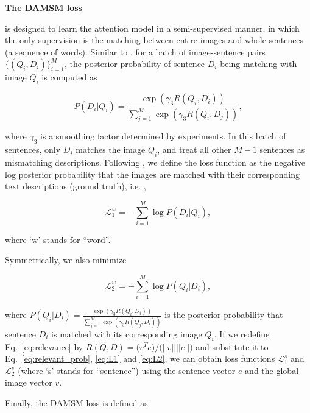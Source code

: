 \textbf{The DAMSM loss} { is designed to learn the attention model in a semi-supervised manner, in which the only supervision is the matching between entire images and whole sentences (a sequence of words). Similar to \cite{FangGISDDGHMPZZ15,Huang13LDS}, for a batch of image-sentence pairs $\{(Q_i, D_i)\}_{i=1}^M$, the posterior probability of sentence $D_i$ being matching with image $Q_i$ is computed as

\begin{equation}\label{eq:relevant_prob}
  P(D_i|Q_i) = \frac{\exp(\gamma_{3} R(Q_i, D_i))}{\sum_{j=1}^M{\exp(\gamma_{3} R(Q_i, D_{j}))}},
 \end{equation}

where $\gamma_{3}$ is a smoothing factor determined by experiments. In this batch of sentences, only $D_i$ matches the image $Q_i$, and treat all other $M-1$ sentences as mismatching descriptions. Following \cite{FangGISDDGHMPZZ15,Huang13LDS}, we define the loss function as the negative log posterior probability that the images are matched with their corresponding text descriptions (ground truth), i.e. ,

\begin{equation}\label{eq:L1}
\mathcal{L}^{w}_{1} = -\sum_{i=1}^M \log P(D_i|Q_i),
\end{equation}

where `w' stands for ``word''. 

Symmetrically, we also minimize

\begin{equation}\label{eq:L2}
\mathcal{L}^{w}_{2} = -\sum_{i=1}^M \log P(Q_i|D_i),
\end{equation}

where $P(Q_i|D_i) = \frac{\exp(\gamma_{3} R(Q_i, D_i))}{\sum_{j=1}^M {\exp(\gamma_{3} R(Q_{j}, D_i))}}$ is the posterior probability that sentence $D_i$ is matched with its corresponding image $Q_i$. If we redefine Eq.~\eqref{eq:relevance} by $R(Q, D) = \big(\overline{v}^T \overline{e}\big) / \big(||\overline{v}|| ||\overline{e}||\big)$ and substitute it to Eq.~\eqref{eq:relevant_prob}, \eqref{eq:L1} and \eqref{eq:L2}, we can obtain loss functions $\mathcal{L}^{s}_{1}$ and $\mathcal{L}^{s}_{2}$ (where `s' stands for ``sentence'') using the sentence vector $\overline{e}$ and the global image vector $\overline{v}$. 

Finally, the DAMSM loss is defined as

\begin{equation}\label{eq:L_DAMSM}


\end{equation}}
